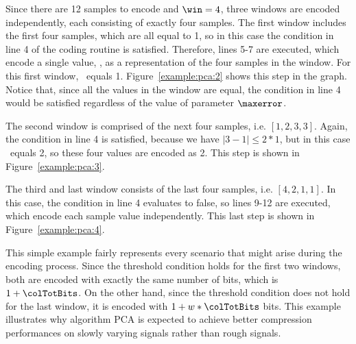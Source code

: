 Since there are 12 samples to encode and $\win=4$, three windows are encoded independently, each consisting of exactly four samples. The first window includes the first four samples, which are all equal to 1, so in this case the condition in line 4 of the coding routine is satisfied. Therefore, lines 5-7 are executed, which encode a single value, \midrange, as a representation of the four samples in the window. For this first window, \midrange\ equals 1. Figure~\ref{example:pca:2} shows this step in the graph. Notice that, since all the values in the window are equal, the condition in line 4 would be satisfied regardless of the value of parameter $\maxerror$.




The second window is comprised of the next four samples, i.e. $[1, 2, 3, 3]$. Again, the condition in line 4 is satisfied, because we have $|3 - 1| \leq 2*1$, but in this case \midrange\ equals 2, so these four values are encoded as 2. This step is shown in Figure~\ref{example:pca:3}.




\vspace{-10pt}
The third and last window consists of the last four samples, i.e. $[4, 2, 1, 1]$. In this case, the condition in line 4 evaluates to false, so lines 9-12 are executed, which encode each sample value independently. This last step is shown in Figure~\ref{example:pca:4}.




\vspace{-10pt}
This simple example fairly represents every scenario that might arise during the encoding process. Since the threshold condition holds for the first two windows, both are encoded with exactly the same number of bits, which is $1 + \colTotBits$. On the other hand, since the threshold condition does not hold for the last window, it is encoded with $1 + w*\colTotBits$ bits. This example illustrates why algorithm PCA is expected to achieve better compression performances on slowly varying signals rather than rough signals.




